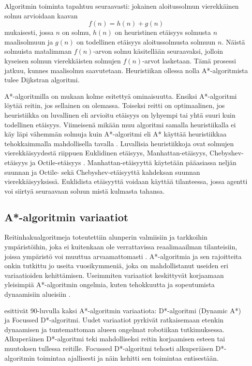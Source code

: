 \documentclass[utf8]{gradu3}
\begin{document}
Algoritmin toiminta tapahtuu seuraavasti: jokainen aloitussolmun vierekkäinen solmu arvioidaan kaavan \[f(n)=h(n)+g(n)\] mukaisesti, jossa \(n\) on solmu, \(h(n)\) on heuristinen etäisyys solmusta \(n\) maalisolmuun ja \(g(n)\) on todellinen etäisyys aloitussolmusta solmuun \(n\). Näistä solmuista matalimman \(f(n)\)-arvon solmu käsitellään seuraavaksi, jolloin kyseisen solmun vierekkäisten solmujen \(f(n)\)-arvot lasketaan. Tämä prosessi jatkuu, kunnes maalisolmu saavutetaan. Heuristiikan ollessa nolla A*-algoritmista tulee Dijkstran algoritmi.

A*-algoritmilla on \textcite{hart1968formal} mukaan kolme esitettyä ominaisuutta. Ensiksi A*-algoritmi löytää reitin, jos sellainen on olemassa. Toiseksi reitti on optimaalinen, jos heuristiikka on luvallinen eli arvioitu etäisyys on lyhyempi tai yhtä suuri kuin todellinen etäisyys. Viimeisenä mikään muu algoritmi samalla heuristiikalla ei käy läpi vähemmän solmuja kuin A*-algoritmi eli A* käyttää heuristiikkaa tehokkaimmalla mahdollisella tavalla \parencite{cui2011based,hart1968formal}. Luvallisia heuristiikkoja ovat solmujen vierekkäisyydestä riippuen Euklidinen etäisyys, Manhattan-etäisyys, Chebyshev-etäisyys ja Octile-etäisyys \parencite{duchovn2014path,botea2013pathfinding}. Manhattan-etäisyyttä käytetään pääasiassa neljän suunnan ja Octile- sekä Chebyshev-etäisyyttä kahdeksan suunnan vierekkäisyyksissä. Euklidista etäisyyttä voidaan käyttää tilanteessa, jossa agentti voi siirtyä seuraavaan soluun mistä kulmasta tahansa.

\subsection{A*-algoritmin variaatiot}
\label{avariaatiot}

Reitinhakualgoritmeja toteutettiin alunperin valmiisiin ja tarkkoihin ympäristöihin, joka ei kuitenkaan ole verrattavissa reaalimaailman tilanteisiin, joissa ympäristö voi muuttua arvaamattomasti \parencite{lawande2022systematic}. A*-algoritmia ja sen rajoitteita onkin tutkittu jo useita vuosikymmeniä, joka on mahdollistanut useiden eri variaatioiden kehittämisen. Useimmiten variaatiot keskittyvät korjaamaan yleisimpiä A*-algoritmin ongelmia, kuten tehokkuutta ja sopeutumista dynaamisiin alueisiin \parencite{stentz1994optimal}.

\textcite{stentz1994optimal,stentz1995focussed} esittivät 90-luvulla kaksi A*-algoritmin variaatiota: D*-algoritmi (Dynamic A*) ja Focussed D*-algoritmi. Uudet variaatiot pyrkivät ratkaisemaan etenkin dynaamisen ja tuntemattoman alueen ongelmat robotiikan tutkimuksessa. Alkuperäinen D*-algoritmi teki mahdolliseksi reitin korjaamisen esteen tai muutoksen tullessa reitille. Focussed D*-algoritmi tehosti alkuperäisen D*-algoritmin toimintaa ajallisesti ja näin kehitti sen toimintaa entisestään.
\end{document}

